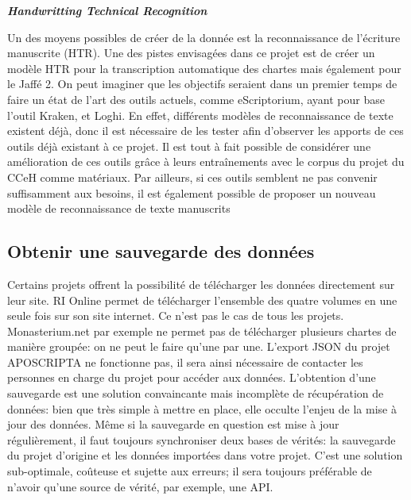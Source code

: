\noindent \textbf{\textit{Handwritting Technical Recognition}}

 Un des moyens possibles de créer de la donnée est la reconnaissance de l’écriture manuscrite (HTR). Une des pistes envisagées dans ce projet est de créer un modèle HTR pour la transcription automatique des chartes mais également pour le Jaffé 2. On peut imaginer que les objectifs seraient dans un premier temps de faire un état de l’art des outils actuels, comme eScriptorium, ayant pour base l’outil Kraken, et Loghi. En effet, différents modèles de reconnaissance de texte existent déjà, donc il est nécessaire de les tester afin d’observer les apports de ces outils déjà existant à ce projet. Il est tout à fait possible de considérer une amélioration de ces outils grâce à leurs entraînements avec le corpus du projet du CCeH comme matériaux. Par ailleurs, si ces outils semblent ne pas convenir suffisamment aux besoins, il est également possible de proposer un nouveau modèle de reconnaissance de texte manuscrits

    
    \subsection{Obtenir une sauvegarde des données}

Certains projets offrent la possibilité de télécharger les données directement sur leur site. RI Online permet de télécharger l’ensemble des quatre volumes en une seule fois sur son site internet. Ce n’est pas le cas de tous les projets. Monasterium.net par exemple ne permet pas de télécharger plusieurs chartes de manière groupée: on ne peut le faire qu’une par une. L’export JSON du projet APOSCRIPTA ne fonctionne pas, il sera ainsi nécessaire de contacter les personnes en charge du projet pour accéder aux données.
L’obtention d’une sauvegarde est une solution convaincante mais incomplète de récupération de données: bien que très simple à mettre en place, elle occulte l’enjeu de la mise à jour des données.  Même si la sauvegarde en question est mise à jour régulièrement, il faut toujours synchroniser deux bases de vérités: la sauvegarde du projet d’origine et les données importées dans votre projet. C’est une solution sub-optimale, coûteuse et sujette aux erreurs; il sera toujours préférable de n’avoir qu’une source de vérité, par exemple, une API.\\

